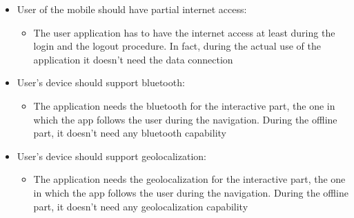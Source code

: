 \begin{itemize}
	\item User of the mobile should have partial internet access:
	\begin{itemize}
		\item The user application has to have the internet access at least during the login and the logout procedure. In fact, during the actual use of the application it doesn't need the data connection
	\end{itemize}
	\item User's device should support bluetooth:
	\begin{itemize}
		\item The application needs the bluetooth for the interactive part, the one in which the app follows the user during the navigation. During the offline part, it doesn't need any bluetooth capability
	\end{itemize}
	\item User's device should support geolocalization:
	\begin{itemize}
		\item The application needs the geolocalization for the interactive part, the one in which the app follows the user during the navigation. During the offline part, it doesn't need any geolocalization capability
	\end{itemize}
\end{itemize}